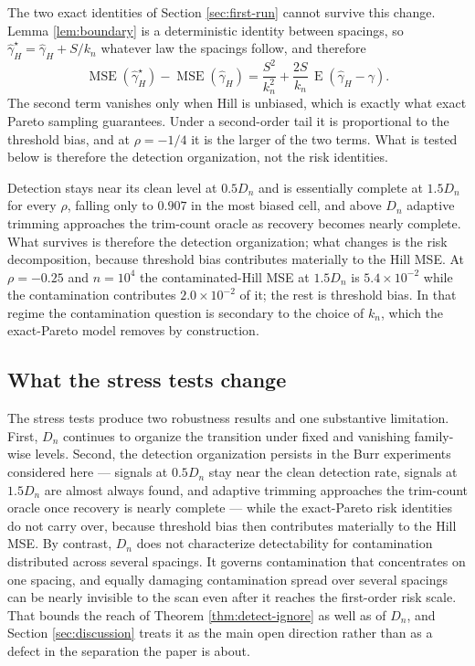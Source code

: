 \documentclass[11pt]{article}
\DeclareMathOperator{\E}{E}
\newcommand{\ghat}{\widehat{\gamma}}
\begin{document}
The two exact identities of Section \ref{sec:first-run} cannot survive this
change.  Lemma \ref{lem:boundary} is a deterministic identity between
spacings, so $\ghat_H^\star=\ghat_H+S/k_n$
whatever law the spacings follow, and therefore
\[
  \operatorname{MSE}(\ghat_H^\star)-\operatorname{MSE}(\ghat_H)
  =
  \frac{S^2}{k_n^2}
  +
  \frac{2S}{k_n}\,\E(\ghat_H-\gamma).
\]
The second term vanishes only when Hill is unbiased, which is exactly what
exact Pareto sampling guarantees.  Under a second-order tail it is proportional
to the threshold bias, and at $\rho=-1/4$ it is the larger of the two terms.
What is tested below is therefore the detection organization, not the risk
identities.

Detection stays near its clean level at $0.5D_n$ and is essentially complete
at $1.5D_n$ for every $\rho$, falling only to $0.907$ in the most biased cell,
and above $D_n$ adaptive trimming approaches the trim-count oracle as recovery
becomes nearly complete.  What survives is therefore the detection
organization; what changes is the risk decomposition, because threshold bias
contributes materially to the Hill MSE.  At $\rho=-0.25$ and $n=10^4$
the contaminated-Hill MSE at $1.5D_n$ is $5.4\times10^{-2}$ while the
contamination contributes $2.0\times10^{-2}$ of it; the rest is threshold bias.
In that regime the contamination question is secondary to the choice of $k_n$,
which the exact-Pareto model removes by construction.



\FloatBarrier

\subsection{What the stress tests change}

The stress tests produce two robustness results and one substantive
limitation.  First, $D_n$ continues to organize the transition under fixed and
vanishing family-wise levels.  Second, the detection organization persists in
the Burr experiments considered here --- signals at $0.5D_n$ stay near the
clean detection rate, signals at $1.5D_n$ are almost always found, and adaptive
trimming approaches the trim-count oracle once recovery is nearly complete ---
while the exact-Pareto risk identities do not carry over, because threshold
bias then contributes materially to the Hill MSE.  By contrast, $D_n$ does not
characterize detectability for contamination distributed across several
spacings.  It governs contamination that concentrates on one spacing, and
equally
damaging contamination spread over several spacings can be nearly invisible to
the scan even after it reaches the first-order risk scale.  That bounds the
reach of Theorem \ref{thm:detect-ignore} as well as of $D_n$, and Section
\ref{sec:discussion} treats it as the main open direction rather than as a
defect in the separation the paper is about.
\end{document}
